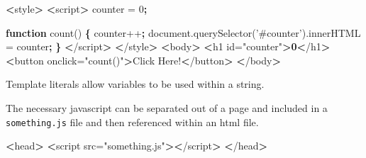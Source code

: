 \documentclass[]{book}
\newenvironment{Shaded}{\begin{snugshade}}{\end{snugshade}}
\newcommand{\KeywordTok}[1]{\textcolor[rgb]{0.13,0.29,0.53}{\textbf{#1}}}
\newcommand{\StringTok}[1]{\textcolor[rgb]{0.31,0.60,0.02}{#1}}
\newcommand{\FunctionTok}[1]{\textcolor[rgb]{0.00,0.00,0.00}{#1}}
\newcommand{\VariableTok}[1]{\textcolor[rgb]{0.00,0.00,0.00}{#1}}
\newcommand{\OperatorTok}[1]{\textcolor[rgb]{0.81,0.36,0.00}{\textbf{#1}}}
\newcommand{\ExtensionTok}[1]{#1}
\newcommand{\NormalTok}[1]{#1}
\begin{document}
\begin{Shaded}
\begin{Highlighting}[]
\OperatorTok{<}\ExtensionTok{style}\OperatorTok{>}
    \OperatorTok{<}\ExtensionTok{script}\OperatorTok{>}
        \ExtensionTok{counter}\NormalTok{ = 0}\KeywordTok{;}                                               
                                                                   
        \KeywordTok{function}\FunctionTok{ count()} \KeywordTok{\{}                                         
            \ExtensionTok{counter++}\KeywordTok{;}                                             
            \ExtensionTok{document.querySelector}\NormalTok{(}\StringTok{'#counter'}\NormalTok{)}\ExtensionTok{.innerHTML}\NormalTok{ = counter}\KeywordTok{;}
        \KeywordTok{\}}                                                          
    \OperatorTok{<}\NormalTok{/}\ExtensionTok{script}\OperatorTok{>}
\OperatorTok{<}\NormalTok{/}\ExtensionTok{style}\OperatorTok{>}
\OperatorTok{<}\ExtensionTok{body}\OperatorTok{>}
    \OperatorTok{<}\ExtensionTok{h1}\NormalTok{ id=}\StringTok{"counter"}\OperatorTok{>0<}\NormalTok{/h1}\OperatorTok{>}                       
    \OperatorTok{<}\ExtensionTok{button}\NormalTok{ onclick=}\StringTok{"count()"}\OperatorTok{>}\NormalTok{Click Here!}\OperatorTok{<}\NormalTok{/button}\OperatorTok{>}
\OperatorTok{<}\NormalTok{/}\ExtensionTok{body}\OperatorTok{>}
\end{Highlighting}
\end{Shaded}

Template literals allow variables to be used within a string.

\begin{Shaded}
\end{Shaded}

The necessary javascript can be separated out of a page and included in
a \texttt{something.js} file and then referenced within an html file.

\begin{Shaded}
\begin{Highlighting}[]
\OperatorTok{<}\FunctionTok{head}\OperatorTok{>}                                 
    \OperatorTok{<}\ExtensionTok{script}\NormalTok{ src=}\StringTok{"something.js"}\OperatorTok{><}\NormalTok{/script}\OperatorTok{>}
\OperatorTok{<}\NormalTok{/}\ExtensionTok{head}\OperatorTok{>}                                
\end{Highlighting}
\end{Shaded}
\end{document}
